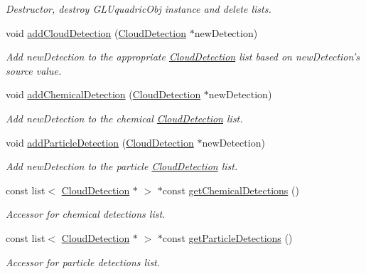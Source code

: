 \begin{DoxyCompactItemize}
\begin{DoxyCompactList}\small\item\em Destructor, destroy GLUquadricObj instance and delete lists. \end{DoxyCompactList}\item 
void \hyperlink{class_cloud_detection_belief_a0746f012d3f23d972906c923876f5251}{addCloudDetection} (\hyperlink{class_cloud_detection}{CloudDetection} $\ast$newDetection)
\begin{DoxyCompactList}\small\item\em Add newDetection to the appropriate \hyperlink{class_cloud_detection}{CloudDetection} list based on newDetection's source value. \end{DoxyCompactList}\item 
void \hyperlink{class_cloud_detection_belief_aada5e49a56a2d2dadd2b727715294ed2}{addChemicalDetection} (\hyperlink{class_cloud_detection}{CloudDetection} $\ast$newDetection)
\begin{DoxyCompactList}\small\item\em Add newDetection to the chemical \hyperlink{class_cloud_detection}{CloudDetection} list. \end{DoxyCompactList}\item 
void \hyperlink{class_cloud_detection_belief_a5f27971fd0f784a06b5f14c761fdbd6c}{addParticleDetection} (\hyperlink{class_cloud_detection}{CloudDetection} $\ast$newDetection)
\begin{DoxyCompactList}\small\item\em Add newDetection to the particle \hyperlink{class_cloud_detection}{CloudDetection} list. \end{DoxyCompactList}\item 
const list$<$ \hyperlink{class_cloud_detection}{CloudDetection} $\ast$ $>$ $\ast$const \hyperlink{class_cloud_detection_belief_ae6828096f9c0f5ef24bb8f7f0379c287}{getChemicalDetections} ()
\begin{DoxyCompactList}\small\item\em Accessor for chemical detections list. \end{DoxyCompactList}\item 
const list$<$ \hyperlink{class_cloud_detection}{CloudDetection} $\ast$ $>$ $\ast$const \hyperlink{class_cloud_detection_belief_a7f349653637a639ac52a729559e80b32}{getParticleDetections} ()
\begin{DoxyCompactList}\small\item\em Accessor for particle detections list. \end{DoxyCompactList}\item 

\end{DoxyCompactItemize}
